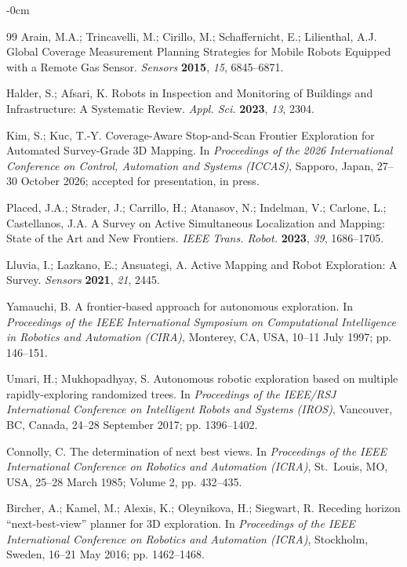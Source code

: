 \documentclass[sensors,article,submit,pdftex,moreauthors]{Definitions/mdpi}
\begin{document}
\begin{adjustwidth}{-\extralength}{0cm}
\begin{thebibliography}{99}
Arain, M.A.; Trincavelli, M.; Cirillo, M.; Schaffernicht, E.; Lilienthal, A.J. Global Coverage Measurement Planning Strategies for Mobile Robots Equipped with a Remote Gas Sensor. \textit{Sensors} \textbf{2015}, \textit{15}, 6845--6871.

Halder, S.; Afsari, K. Robots in Inspection and Monitoring of Buildings and Infrastructure: A Systematic Review. \textit{Appl. Sci.} \textbf{2023}, \textit{13}, 2304.

Kim, S.; Kuc, T.-Y. Coverage-Aware Stop-and-Scan Frontier Exploration for Automated Survey-Grade 3D Mapping. In \textit{Proceedings of the 2026 International Conference on Control, Automation and Systems (ICCAS)}, Sapporo, Japan, 27--30 October 2026; accepted for presentation, in press.

Placed, J.A.; Strader, J.; Carrillo, H.; Atanasov, N.; Indelman, V.; Carlone, L.; Castellanos, J.A. A Survey on Active Simultaneous Localization and Mapping: State of the Art and New Frontiers. \textit{IEEE Trans. Robot.} \textbf{2023}, \textit{39}, 1686--1705.

Lluvia, I.; Lazkano, E.; Ansuategi, A. Active Mapping and Robot Exploration: A Survey. \textit{Sensors} \textbf{2021}, \textit{21}, 2445.

Yamauchi, B. A frontier-based approach for autonomous exploration. In \textit{Proceedings of the IEEE International Symposium on Computational Intelligence in Robotics and Automation (CIRA)}, Monterey, CA, USA, 10--11 July 1997; pp. 146--151.

Umari, H.; Mukhopadhyay, S. Autonomous robotic exploration based on multiple rapidly-exploring randomized trees. In \textit{Proceedings of the IEEE/RSJ International Conference on Intelligent Robots and Systems (IROS)}, Vancouver, BC, Canada, 24--28 September 2017; pp. 1396--1402.

Connolly, C. The determination of next best views. In \textit{Proceedings of the IEEE International Conference on Robotics and Automation (ICRA)}, St.\ Louis, MO, USA, 25--28 March 1985; Volume 2, pp. 432--435.

Bircher, A.; Kamel, M.; Alexis, K.; Oleynikova, H.; Siegwart, R. Receding horizon ``next-best-view'' planner for 3D exploration. In \textit{Proceedings of the IEEE International Conference on Robotics and Automation (ICRA)}, Stockholm, Sweden, 16--21 May 2016; pp. 1462--1468.


\end{thebibliography}
\end{adjustwidth}
\end{document}
